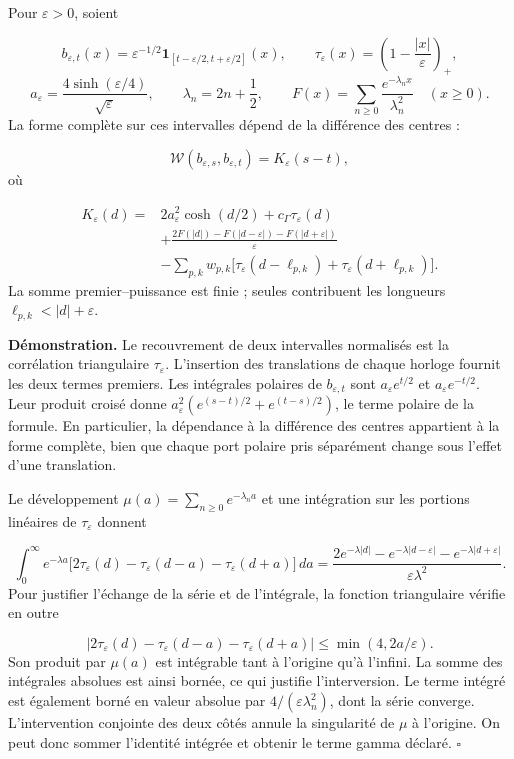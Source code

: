 Pour \(\varepsilon>0\), soient

\[
b_{\varepsilon,t}(x)=\varepsilon^{-1/2}
\mathbf1_{[t-\varepsilon/2,t+\varepsilon/2]}(x),\qquad
\tau_\varepsilon(x)=\left(1-\frac{|x|}{\varepsilon}\right)_+,
\]
\[
a_\varepsilon=\frac{4\sinh(\varepsilon/4)}{\sqrt\varepsilon},
\qquad \lambda_n=2n+\frac12,\qquad
F(x)=\sum_{n\geq0}\frac{e^{-\lambda_nx}}{\lambda_n^2}
\quad(x\geq0).
\]
La forme complète sur ces intervalles dépend de la différence des centres :

\[
\mathscr W(b_{\varepsilon,s},b_{\varepsilon,t})
=K_\varepsilon(s-t),
\]
où

\[
\begin{aligned}
K_\varepsilon(d)={}&2a_\varepsilon^2\cosh(d/2)
+c_\Gamma\tau_\varepsilon(d)\\
&+\frac{2F(|d|)-F(|d-\varepsilon|)-F(|d+\varepsilon|)}{\varepsilon}\\
&-\sum_{p,k}w_{p,k}\bigl[
\tau_\varepsilon(d-\ell_{p,k})+
\tau_\varepsilon(d+\ell_{p,k})\bigr].
\end{aligned}
\]
La somme premier–puissance est finie ; seules contribuent les longueurs \(\ell_{p,k}<|d|+\varepsilon\).

\textbf{Démonstration.} Le recouvrement de deux intervalles normalisés est la corrélation triangulaire \(\tau_\varepsilon\). L'insertion des translations de chaque horloge fournit les deux termes premiers. Les intégrales polaires de \(b_{\varepsilon,t}\) sont \(a_\varepsilon e^{t/2}\) et \(a_\varepsilon e^{-t/2}\). Leur produit croisé donne \(a_\varepsilon^2(e^{(s-t)/2}+e^{(t-s)/2})\), le terme polaire de la formule. En particulier, la dépendance à la différence des centres appartient à la forme complète, bien que chaque port polaire pris séparément change sous l'effet d'une translation.

Le développement \(\mu(a)=\sum_{n\geq0}e^{-\lambda_na}\) et une intégration sur les portions linéaires de \(\tau_\varepsilon\) donnent

\[
\int_0^\infty e^{-\lambda a}
\bigl[2\tau_\varepsilon(d)-\tau_\varepsilon(d-a)
-\tau_\varepsilon(d+a)\bigr]\,da
=\frac{2e^{-\lambda|d|}-e^{-\lambda|d-\varepsilon|}
-e^{-\lambda|d+\varepsilon|}}{\varepsilon\lambda^2}.
\]
Pour justifier l’échange de la série et de l’intégrale, la fonction triangulaire vérifie en outre

\[
|2\tau_\varepsilon(d)-\tau_\varepsilon(d-a)-\tau_\varepsilon(d+a)|
\leq\min(4,2a/\varepsilon).
\]
Son produit par \(\mu(a)\) est intégrable tant à l’origine qu’à l’infini. La somme des intégrales absolues est ainsi bornée, ce qui justifie l’interversion. Le terme intégré est également borné en valeur absolue par \(4/(\varepsilon\lambda_n^2)\), dont la série converge. L’intervention conjointe des deux côtés annule la singularité de \(\mu\) à l’origine. On peut donc sommer l’identité intégrée et obtenir le terme gamma déclaré. \hfill\(\square\)

